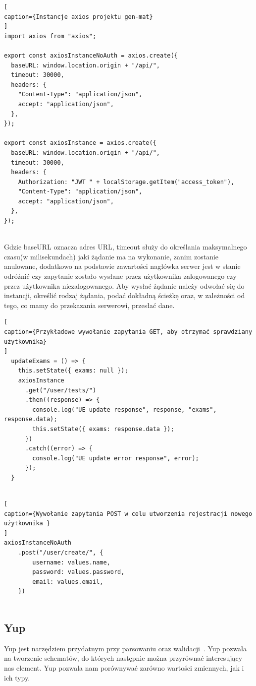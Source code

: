 \documentclass[oneside,polski,logo,indent]{amuthesis}
\begin{document}
\begin{lstlisting}[
caption={Instancje axios projektu gen-mat}
]
import axios from "axios";

export const axiosInstanceNoAuth = axios.create({
  baseURL: window.location.origin + "/api/",
  timeout: 30000,
  headers: {
    "Content-Type": "application/json",
    accept: "application/json",
  },
});

export const axiosInstance = axios.create({
  baseURL: window.location.origin + "/api/",
  timeout: 30000,
  headers: {
    Authorization: "JWT " + localStorage.getItem("access_token"),
    "Content-Type": "application/json",
    accept: "application/json",
  },
});


\end{lstlisting}

Gdzie baseURL oznacza adres URL, timeout służy do określania maksymalnego czasu(w milisekundach) jaki żądanie ma na wykonanie, zanim zostanie anulowane, dodatkowo na podstawie zawartości nagłówka serwer jest w stanie odróżnić czy zapytanie zostało wysłane przez użytkownika zalogowanego czy przez użytkownika niezalogowanego. Aby wysłać żądanie należy  odwołać się do instancji, określić rodzaj żądania, podać dokładną ścieżkę oraz, w zależności od tego, co mamy do przekazania serwerowi, przesłać dane.

\begin{lstlisting}[
caption={Przykładowe wywołanie zapytania GET, aby otrzymać sprawdziany użytkownika}
]
  updateExams = () => {
    this.setState({ exams: null });
    axiosInstance
      .get("/user/tests/")
      .then((response) => {
        console.log("UE update response", response, "exams", response.data);
        this.setState({ exams: response.data });
      })
      .catch((error) => {
        console.log("UE update error response", error);
      });
  }


\end{lstlisting}

\begin{lstlisting}[
caption={Wywołanie zapytania POST w celu utworzenia rejestracji nowego użytkownika }
]
axiosInstanceNoAuth
	.post("/user/create/", {
		username: values.name,
		password: values.password,
		email: values.email,
	})


\end{lstlisting}


\subsection{Yup}
Yup jest narzędziem przydatnym przy parsowaniu oraz walidacji~\cite{yup}. Yup pozwala na tworzenie schematów, do których następnie
można przyrównać interesujący nas element. Yup pozwala nam porównywać zarówno wartości zmiennych, jak i ich typy.
\end{document}
